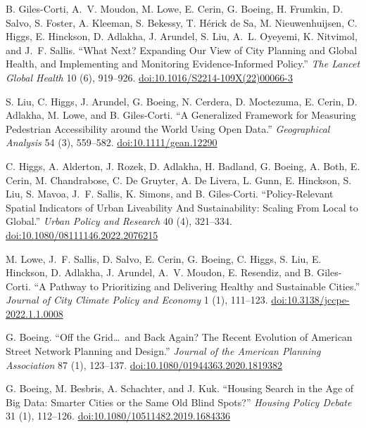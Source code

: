 \begin{tablist}
        \item[2022] \tab{}B. Giles-Corti, A.~V. Moudon, M. Lowe, E. Cerin, G. Boeing, H. Frumkin, D. Salvo, S. Foster, A. Kleeman, S. Bekessy, T. Hérick de Sa, M. Nieuwenhuijsen, C. Higgs, E. Hinckson, D. Adlakha, J. Arundel, S. Liu, A.~L. Oyeyemi, K. Nitvimol, and J.~F. Sallis. \enquote{What Next? Expanding Our View of City Planning and Global Health, and Implementing and Monitoring Evidence-Informed Policy.}  \textit{The Lancet Global Health} 10 (6), 919--926. \href{https://doi.org/10.1016/S2214-109X(22)00066-3}{doi:10.1016/S2214-109X(22)00066-3}

        \item[2022] \tab{}S. Liu, C. Higgs, J. Arundel, G. Boeing, N. Cerdera, D. Moctezuma, E. Cerin, D. Adlakha, M. Lowe, and B. Giles-Corti. \enquote{A Generalized Framework for Measuring Pedestrian Accessibility around the World Using Open Data.} \textit{Geographical Analysis} 54 (3), 559--582. \href{https://doi.org/10.1111/gean.12290}{doi:10.1111/gean.12290}

        \item[2022] \tab{}C. Higgs, A. Alderton, J. Rozek, D. Adlakha, H. Badland, G. Boeing, A. Both, E. Cerin, M. Chandrabose, C. De Gruyter, A. De Livera, L. Gunn, E. Hinckson, S. Liu, S. Mavoa, J.~F. Sallis, K. Simons, and B. Giles-Corti. \enquote{Policy-Relevant Spatial Indicators of Urban Liveability And Sustainability: Scaling From Local to Global.} \textit{Urban Policy and Research} 40 (4), 321--334. \href{https://doi.org/10.1080/08111146.2022.2076215}{doi:10.1080/08111146.2022.2076215}

        \item[2022] \tab{}M. Lowe, J.~F. Sallis, D. Salvo, E. Cerin, G. Boeing, C. Higgs, S. Liu, E. Hinckson, D. Adlakha, J. Arundel, A.~V. Moudon, E. Resendiz, and B. Giles-Corti. \enquote{A Pathway to Prioritizing and Delivering Healthy and Sustainable Cities.} \textit{Journal of City Climate Policy and Economy} 1 (1), 111--123. \href{https://doi.org/10.3138/jccpe-2022.1.1.0008}{doi:10.3138/jccpe-2022.1.1.0008}

        \item[2021] \tab{}G. Boeing. \enquote{Off the Grid\ldots\ and Back Again? The Recent Evolution of American Street Network Planning and Design.} \textit{Journal of the American Planning Association} 87 (1), 123--137. \href{https://doi.org/10.1080/01944363.2020.1819382}{doi:10.1080/01944363.2020.1819382}

        \item[2021] \tab{}G. Boeing, M. Besbris, A. Schachter, and J. Kuk. \enquote{Housing Search in the Age of Big Data: Smarter Cities or the Same Old Blind Spots?} \textit{Housing Policy Debate} 31 (1), 112--126. \href{https://doi.org/10.1080/10511482.2019.1684336}{doi:10.1080/10511482.2019.1684336}


\end{tablist}
